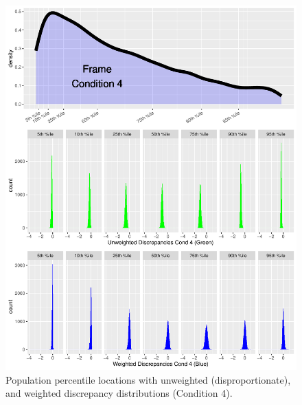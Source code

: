 \documentclass[
  ,man]{apa7}
\begin{document}
\begin{figure}
\centering
\includegraphics{NormsBuilding_files/figure-latex/Figure6-1.pdf}
\caption{\label{fig:Figure6}Population percentile locations with unweighted (disproportionate), and weighted discrepancy distributions (Condition 4).}
\end{figure}
\end{document}
